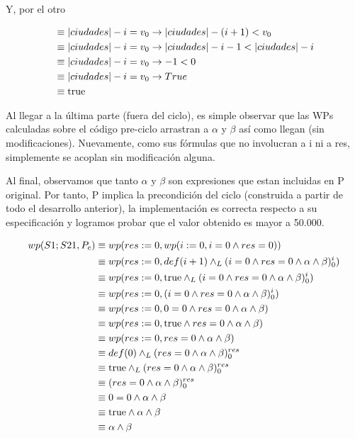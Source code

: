 \documentclass[10pt,a4paper]{article}
\begin{document}
\begin {enumerate}
    Y, por el otro 

    \begin{align*}
        &\equiv |ciudades| - i = v_{0} \to |ciudades| - (i + 1) < v_{0} \\
        &\equiv |ciudades| - i = v_{0} \to |ciudades| - i - 1 < |ciudades| - i \\
        &\equiv |ciudades| - i = v_{0} \to - 1 < 0 \\
        &\equiv |ciudades| - i = v_{0} \to True \\
        &\equiv \mathrm{true}   
    \end{align*}



    Al llegar a la última parte (fuera del ciclo), es simple observar que las WPs calculadas sobre el código pre-ciclo arrastran a $\alpha$ y $\beta$ así como llegan
    (sin modificaciones). Nuevamente, como sus fórmulas que no involucran a i ni a res, simplemente se acoplan sin modificación alguna.

    Al final, observamos que tanto $\alpha$ y $\beta$ son expresiones que estan incluidas en P original. Por tanto, P implica la precondición
    del ciclo (construida a partir de todo el desarrollo anterior), la implementación es correcta respecto a su especificación y logramos 
    probar que el valor obtenido es mayor a 50.000.

    \begin{align*}
        wp(S1;S21, P_{c}) &\equiv wp(res := 0, wp(i := 0, i = 0 \land res = 0 )) \\
        &\equiv wp(res := 0, def(i + 1) \land _L (i = 0 \land res = 0 \land \alpha \land \beta)_{0}^{i}) \\
        &\equiv wp(res := 0, \mathrm{true} \land _L (i = 0 \land res = 0 \land \alpha \land \beta)_{0}^{i}) \\
        &\equiv wp(res := 0, (i = 0 \land res = 0 \land \alpha \land \beta)_{0}^{i}) \\
        &\equiv wp(res := 0, 0 = 0 \land res = 0 \land \alpha \land \beta) \\
        &\equiv wp(res := 0, \mathrm{true} \land res = 0 \land \alpha \land \beta) \\
        &\equiv wp(res := 0, res = 0 \land \alpha \land \beta) \\
        &\equiv def (0) \land _L (res = 0  \land \alpha \land \beta)_{0}^{res} \\
        &\equiv \mathrm{true} \land _L (res = 0 \land \alpha \land \beta)_{0}^{res} \\
        &\equiv (res = 0  \land \alpha \land \beta)_{0}^{res} \\
        &\equiv 0 = 0  \land \alpha \land \beta \\
        &\equiv \mathrm{true}  \land \alpha \land \beta\\
        &\equiv \alpha \land \beta
    \end{align*}


\end{enumerate}
\end{document}
